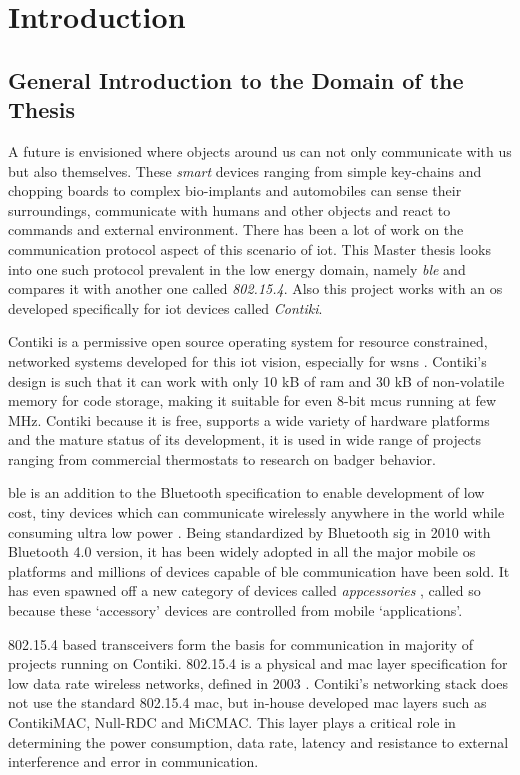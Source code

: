 \chapter{Introduction}

\section{General Introduction to the Domain of the Thesis}

A future is envisioned where objects around us can not only communicate with us but also themselves. These \emph{smart} devices ranging from simple key-chains and chopping boards to complex bio-implants and automobiles can sense their surroundings, communicate with humans and other objects and react to commands and external environment. There has been a lot of work on the communication protocol aspect of this scenario of \gls{iot}. This Master thesis looks into one such protocol prevalent in the low energy domain, namely \emph{\acrfull{ble}} and compares it with another one called \emph{802.15.4}. Also this project works with an \gls{os} developed specifically for \gls{iot} devices called \emph{Contiki}.

Contiki is a permissive open source operating system for resource constrained, networked systems developed for this \gls{iot} vision, especially for \glspl{wsn} \cite{Contiki}. Contiki's design is such that it can work with only 10 kB of \gls{ram} and 30 kB of non-volatile memory for code storage, making it suitable for even 8-bit \glspl{mcu} running at few MHz. Contiki because it is free, supports a wide variety of hardware platforms and the mature status of its development, it is used in wide range of projects ranging from commercial thermostats to research on badger behavior. 

\gls{ble} is an addition to the Bluetooth specification to enable  development of low cost, tiny devices which can communicate wirelessly anywhere in the world while consuming ultra low power \cite{CoreSpec4.0}. Being standardized by Bluetooth \gls{sig} in 2010 with Bluetooth 4.0 version, it has been widely adopted in all the major mobile \gls{os} platforms and millions of devices capable of \gls{ble} communication have been sold. It has even spawned off a new category of devices called \emph{appcessories} \cite{ubiquityBeyond}, called so because these `accessory' devices are controlled from mobile `applications'. 

802.15.4 based transceivers form the basis for communication in majority of projects running on Contiki. 802.15.4 is a physical and \gls{mac} layer specification for low data rate wireless networks, defined in 2003 \cite{IEEE802154}. Contiki's networking stack does not use the standard 802.15.4 \gls{mac}, but in-house developed \gls{mac} layers such as ContikiMAC, Null-RDC and MiCMAC. This layer plays a critical role in determining the power consumption, data rate, latency and resistance to external interference and error in communication. 

